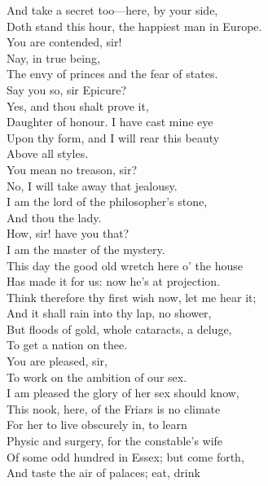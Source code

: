 \documentclass[a4paper,oneside]{memoir}
\begin{document}
\begin{drama*}
And take a secret too---here, by your side,\\
Doth stand this hour, the happiest man in Europe.\\
\dolspeaks You are contended, sir!\\
\mammonspeaks {} Nay, in true being,\\
The envy of princes and the fear of states.\\
\dolspeaks Say you so, sir Epicure?\\
\mammonspeaks {} Yes, and thou shalt prove it,\\
Daughter of honour. I have cast mine eye\\
Upon thy form, and I will rear this beauty\\
Above all styles.\\
\dolspeaks {} You mean no treason, sir?\\
\mammonspeaks No, I will take away that jealousy.\\
I am the lord of the philosopher's stone,\\
And thou the lady.\\
\dolspeaks {} How, sir! have you that?\\
\mammonspeaks I am the master of the mystery.\\
This day the good old wretch here o' the house\\
Has made it for us: now he's at projection.\\
Think therefore thy first wish now, let me hear it;\\
And it shall rain into thy lap, no shower,\\
But floods of gold, whole cataracts, a deluge,\\
To get a nation on thee.\\
\dolspeaks {} You are pleased, sir,\\
To work on the ambition of our sex.\\
\mammonspeaks I am pleased the glory of her sex should know,\\
This nook, here, of the Friars is no climate\\
For her to live obscurely in, to learn\\
Physic and surgery, for the constable's wife\\
Of some odd hundred in Essex; but come forth,\\
And taste the air of palaces; eat, drink\\

\end{drama*}
\end{document}
